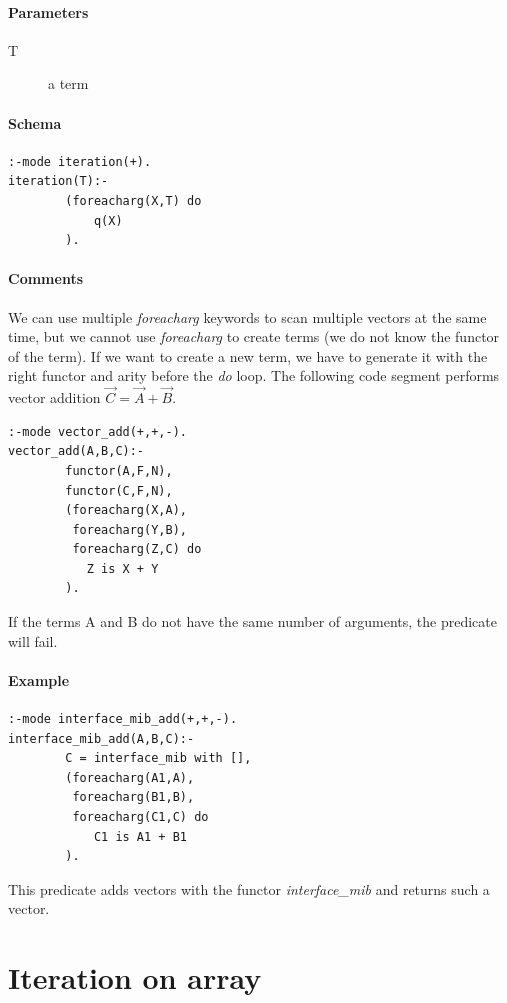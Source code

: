 \documentclass[a4paper,12pt]{report}
\begin{document}
\paragraph{Parameters}
\begin{description}
\item[T] a term
\end{description}
\paragraph{Schema}
\begin{verbatim}
:-mode iteration(+).
iteration(T):-
        (foreacharg(X,T) do
            q(X)
        ).
\end{verbatim}
\paragraph{Comments}
We can use multiple {\it foreacharg} keywords to scan multiple vectors at the same time, but we cannot use {\it foreacharg} to create terms (we do not know the functor of the term). If we want to create a new term, we have to generate it with the right functor and arity before the {\it do} loop. The following code segment performs vector addition $\vec{C} = \vec{A}+ \vec{B}$.
\begin{verbatim}
:-mode vector_add(+,+,-).
vector_add(A,B,C):-
        functor(A,F,N),
        functor(C,F,N),
        (foreacharg(X,A),
         foreacharg(Y,B),
         foreacharg(Z,C) do
           Z is X + Y
        ).
\end{verbatim}
If the terms A and B do not have the same number of arguments, the predicate will fail.
\pagebreak
\paragraph{Example}
\begin{verbatim}
:-mode interface_mib_add(+,+,-).
interface_mib_add(A,B,C):-
        C = interface_mib with [],
        (foreacharg(A1,A),
         foreacharg(B1,B),
         foreacharg(C1,C) do
            C1 is A1 + B1
        ).
\end{verbatim}
This predicate adds vectors with the functor {\it interface\_mib} and returns such a vector.
\pagebreak
\section{Iteration on array}
\label{iterationonarray}
\end{document}
